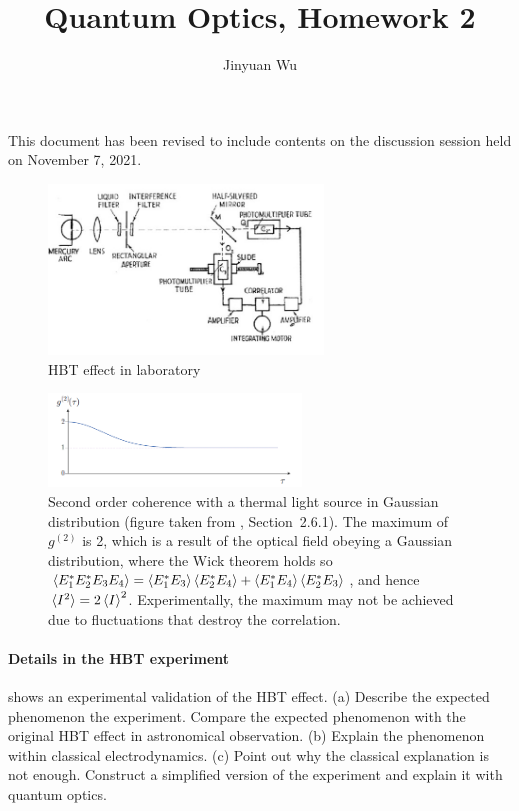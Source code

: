 \documentclass[hyperref, a4paper]{article}
\title{Quantum Optics, Homework 2}
\author{Jinyuan Wu}
\begin{document}
\maketitle

This document has been revised to include contents on the discussion session held on November 7, 2021.

\begin{figure}
    \centering
    \includegraphics[width=0.65\textwidth]{hbt-lab.png}
    \caption{HBT effect in laboratory}
    \label{fig:hbt-lab}
\end{figure}

\begin{figure}
    \centering
    \includegraphics[width=0.6\textwidth]{thermal-state-g2.PNG}
    \caption{Second order coherence with a thermal light source in Gaussian distribution (figure taken from \cite{optical-note-steck}, Section~2.6.1).
    The maximum of $g^{(2)}$ is 2, which is a result of the optical field obeying a Gaussian distribution, where the Wick theorem holds so $\expval{E^*_1 E^*_2 E_3 E_4} = \expval{E^*_1 E_3} \expval{E^*_2 E_4} + \expval{E^*_1 E_4} \expval{E^*_2 E_3}$, and hence $\expval*{I^2} = 2 \expval{I}^2$.
    Experimentally, the maximum may not be achieved due to fluctuations that destroy the correlation.}
    \label{fig:thermal-hbt}
\end{figure}

\paragraph{Details in the HBT experiment}  shows an experimental validation of the HBT effect. 
(a) Describe the expected phenomenon the experiment. Compare the expected phenomenon with the original HBT effect in astronomical observation.
(b) Explain the phenomenon within classical electrodynamics.
(c) Point out why the classical explanation is not enough. Construct a simplified version of the experiment and explain it with quantum optics.
\end{document}
